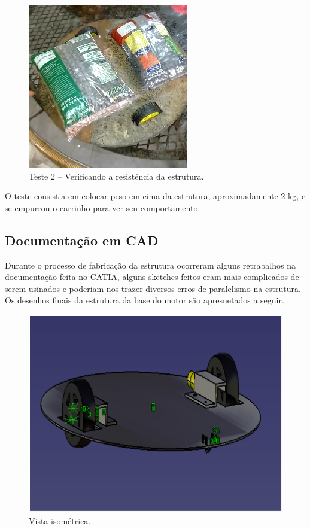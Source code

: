 \begin{figure}[H]
	\centering
	\includegraphics[scale=0.3]{figuras/base_teste_peso.png}
	\caption{Teste 2 – Verificando a resistência da estrutura.}
	\label{img:base_teste_peso}
\end{figure}

O teste consistia em colocar peso em cima da estrutura, aproximadamente 2 kg, e se empurrou o carrinho para ver seu comportamento.

\subsection{Documentação em CAD}

Durante o processo de fabricação da estrutura ocorreram alguns retrabalhos na documentação feita no CATIA, alguns sketches feitos eram mais complicados de serem usinados e poderiam nos trazer diversos erros de paralelismo na estrutura. Os desenhos finais da estrutura da base do motor são apresnetados a seguir.

\begin{figure}[H]
	\centering
	\includegraphics[scale=0.3]{figuras/vista_isometrica.png}
	\caption{Vista isométrica.}
	\label{img:vista_isometrica}
\end{figure}

